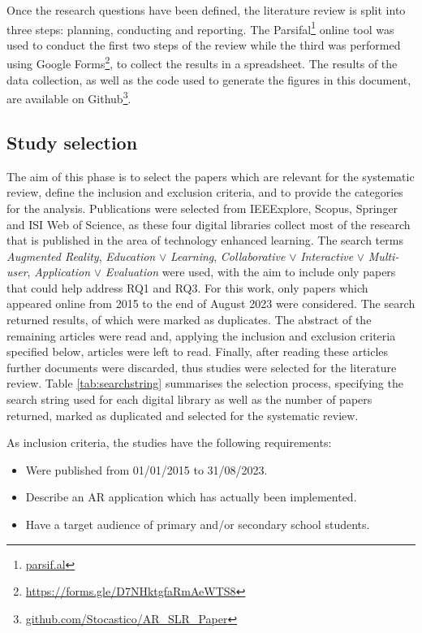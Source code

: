 Once the research questions have been defined, the literature review is split into three steps: planning, conducting and reporting. The Parsifal\footnote{\url{parsif.al}} online tool was used to conduct the first two steps of the review while the third was performed using Google Forms\footnote{\url{https://forms.gle/D7NHktgfaRmAeWTS8}}, to collect the results in a spreadsheet. The results of the data collection, as well as the code used to generate the figures in this document, are available on Github\footnote{\url{github.com/Stocastico/AR\_SLR\_Paper}}.


\subsection{Study selection}
The aim of this phase is to select the papers which are relevant for the systematic review, define the inclusion and exclusion criteria, and to provide the categories for the analysis.
Publications were selected from IEEExplore, Scopus, Springer and ISI Web of Science, as these four digital libraries collect most of the research that is published in the area of technology enhanced learning. The search terms \emph{Augmented Reality}, \emph{Education} $\lor$ \emph{Learning}, \emph{Collaborative} $\lor$ \emph{Interactive} $\lor$ \emph{Multi-user}, \emph{Application} $\lor$ \emph{Evaluation} were used, with the aim to include only papers that could help address RQ1 and RQ3. For this work, only papers which appeared online from 2015 to the end of August 2023 were considered. The search returned \allPapers results, of which \duplPapers were marked as duplicates. The abstract of the remaining \papersCheckAbstract articles were read and, applying the inclusion and exclusion criteria specified below, \papersToRead articles were left to read. Finally, after reading these articles \papersExludedAfterReading further documents were discarded, thus \papersSelected studies were selected for the literature review.
Table \ref{tab:searchstring} summarises the selection process, specifying the search string used for each digital library as well as the number of papers returned, marked as duplicated and selected for the systematic review.

As inclusion criteria, the studies have the following requirements:
\begin{itemize}
    \item Were published from 01/01/2015 to 31/08/2023.
    \item Describe an AR application  which has actually been implemented.
    \item Have a target audience of primary and/or secondary school students.
\end{itemize}


